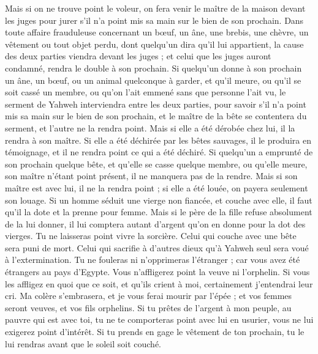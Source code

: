\begin{multicols}{2}
Mais si on ne trouve point le voleur, on fera venir le maître de la maison devant les juges pour jurer s'il n'a point mis sa main sur le bien de son prochain.
Dans toute affaire frauduleuse concernant un bœuf, un âne, une brebis, une chèvre, un vêtement ou tout objet perdu, dont quelqu'un dira qu'il lui appartient, la cause des deux parties viendra devant les juges ; et celui que les juges auront condamné, rendra le double à son prochain.
Si quelqu'un donne à son prochain un âne, un bœuf, ou un animal quelconque à garder, et qu'il meure, ou qu'il se soit cassé un membre, ou qu'on l'ait emmené sans que personne l'ait vu,
le serment de Yahweh interviendra entre les deux parties, pour savoir s'il n'a point mis sa main sur le bien de son prochain, et le maître de la bête se contentera du serment, et l'autre ne la rendra point.
Mais si elle a été dérobée chez lui, il la rendra à son maître.
Si elle a été déchirée par les bêtes sauvages, il le produira en témoignage, et il ne rendra point ce qui a été déchiré.
Si quelqu'un a emprunté de son prochain quelque bête, et qu'elle se casse quelque membre, ou qu'elle meure, son maître n'étant point présent, il ne manquera pas de la rendre.
Mais si son maître est avec lui, il ne la rendra point ; si elle a été louée, on payera seulement son louage.
Si un homme séduit une vierge non fiancée, et couche avec elle, il faut qu'il la dote et la prenne pour femme.
Mais si le père de la fille refuse absolument de la lui donner, il lui comptera autant d'argent qu'on en donne pour la dot des vierges.
Tu ne laisseras point vivre la sorcière.
Celui qui couche avec une bête sera puni de mort.
Celui qui sacrifie à d'autres dieux qu'à Yahweh seul sera voué à l’extermination.
Tu ne fouleras ni n'opprimeras l'étranger ; car vous avez été étrangers au pays d'Egypte.
Vous n'affligerez point la veuve ni l'orphelin.
Si vous les affligez en quoi que ce soit, et qu'ils crient à moi, certainement j'entendrai leur cri.
Ma colère s'embrasera, et je vous ferai mourir par l'épée ; et vos femmes seront veuves, et vos fils orphelins.
Si tu prêtes de l'argent à mon peuple, au pauvre qui est avec toi, tu ne te comporteras point avec lui en usurier, vous ne lui exigerez point d’intérêt.
Si tu prends en gage le vêtement de ton prochain, tu le lui rendras avant que le soleil soit couché.

\end{multicols}

